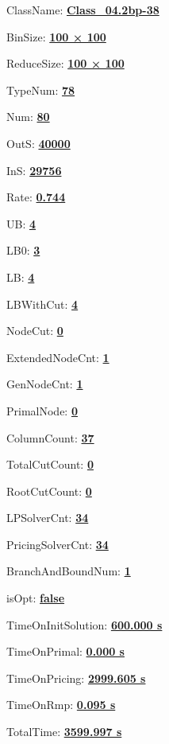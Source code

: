 \documentclass[11pt]{article}
\begin{document}
\pagestyle{empty}


ClassName: \underline{\textbf{Class_04.2bp-38}}
\par
BinSize: \underline{\textbf{100 × 100}}
\par
ReduceSize: \underline{\textbf{100 × 100}}
\par
TypeNum: \underline{\textbf{78}}
\par
Num: \underline{\textbf{80}}
\par
OutS: \underline{\textbf{40000}}
\par
InS: \underline{\textbf{29756}}
\par
Rate: \underline{\textbf{0.744}}
\par
UB: \underline{\textbf{4}}
\par
LB0: \underline{\textbf{3}}
\par
LB: \underline{\textbf{4}}
\par
LBWithCut: \underline{\textbf{4}}
\par
NodeCut: \underline{\textbf{0}}
\par
ExtendedNodeCnt: \underline{\textbf{1}}
\par
GenNodeCnt: \underline{\textbf{1}}
\par
PrimalNode: \underline{\textbf{0}}
\par
ColumnCount: \underline{\textbf{37}}
\par
TotalCutCount: \underline{\textbf{0}}
\par
RootCutCount: \underline{\textbf{0}}
\par
LPSolverCnt: \underline{\textbf{34}}
\par
PricingSolverCnt: \underline{\textbf{34}}
\par
BranchAndBoundNum: \underline{\textbf{1}}
\par
isOpt: \underline{\textbf{false}}
\par
TimeOnInitSolution: \underline{\textbf{600.000 s}}
\par
TimeOnPrimal: \underline{\textbf{0.000 s}}
\par
TimeOnPricing: \underline{\textbf{2999.605 s}}
\par
TimeOnRmp: \underline{\textbf{0.095 s}}
\par
TotalTime: \underline{\textbf{3599.997 s}}
\par
\newpage
\end{document}
